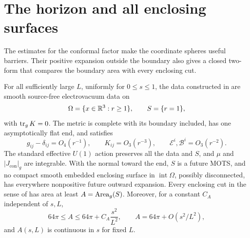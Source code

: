 \section{The horizon and all enclosing surfaces}\label{sec:geometry}

The estimates for the conformal factor make the coordinate spheres useful
barriers.  Their positive expansion outside the boundary also gives a closed
two-form that compares the boundary area with every enclosing cut.

\begin{proposition}\label{prop:geometry}
For all sufficiently large $L$, uniformly for $0\le s\le1$, the data constructed
in  are smooth source-free electrovacuum
data on
\[
 \Omega=\{x\in\mathbb R^3:r\ge1\},\qquad S=\{r=1\},
\]
with $\operatorname{tr}_gK=0$.  The metric is complete with its boundary included, has one
asymptotically flat end, and satisfies
\begin{equation}\label{eq:geometric-falloff}
 g_{ij}-\delta_{ij}=O_4(r^{-1}),\qquad K_{ij}=O_3(r^{-3}),\qquad
 \mathcal E^i,\mathcal B^i=O_3(r^{-2}).
\end{equation}
The standard effective $U(1)$ action preserves all the data and $S$, and
$\mu$ and $|J_{\mathrm{con}}|_g$ are integrable.  With the normal toward the end,
$S$ is a future MOTS, and no compact smooth embedded enclosing surface
in $\operatorname{int}\Omega$, possibly disconnected, has everywhere
nonpositive future outward expansion.  Every enclosing cut in the sense of
 has area at least $A=\operatorname{Area}_g(S)$.  Moreover, for a
constant $C_A$ independent of $s,L$,
\begin{equation}\label{eq:area-estimate}
 64\pi\le A\le64\pi+C_A\frac{s^2}{L^2},
 \qquad A=64\pi+O(s^2/L^2),
\end{equation}
and $A(s,L)$ is continuous in $s$ for fixed $L$.
\end{proposition}

